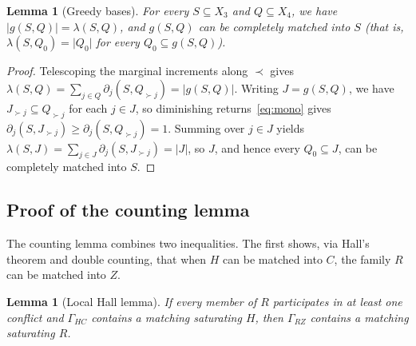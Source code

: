 \documentclass[11pt]{amsart}
\newtheorem{lemma}[theorem]{Lemma}
\theoremstyle{remark}
\newcommand{\abs}[1]{\lvert #1\rvert}
\begin{document}
\begin{lemma}[Greedy bases]\label{lem:greedy}
For every $S\subseteq X_3$ and $Q\subseteq X_4$, we have $\abs{g(S,Q)}=\lambda(S,Q)$, and $g(S,Q)$ can be completely matched into $S$ (that is, $\lambda(S,Q_0)=\abs{Q_0}$ for every $Q_0\subseteq g(S,Q)$).
\end{lemma}

\begin{proof}
Telescoping the marginal increments along $\prec$ gives $\lambda(S,Q)=\sum_{j\in Q}\partial_j(S,Q_{\succ j})=\abs{g(S,Q)}$. Writing $J=g(S,Q)$, we have $J_{\succ j}\subseteq Q_{\succ j}$ for each $j\in J$, so diminishing returns~\eqref{eq:mono} gives $\partial_j(S,J_{\succ j})\ge\partial_j(S,Q_{\succ j})=1$. Summing over $j\in J$ yields $\lambda(S,J)=\sum_{j\in J}\partial_j(S,J_{\succ j})=\abs J$, so $J$, and hence every $Q_0\subseteq J$, can be completely matched into $S$.
\end{proof}


\subsection{Proof of the counting lemma}\label{sec:count}

The counting lemma combines two inequalities. The first shows, via Hall's theorem and double counting, that when $H$ can be matched into $C$, the family $R$ can be matched into $Z$.

\begin{lemma}[Local Hall lemma]\label{lem:local}
If every member of $R$ participates in at least one conflict and $\Gamma_{HC}$ contains a matching saturating $H$, then $\Gamma_{RZ}$ contains a matching saturating $R$.
\end{lemma}
\end{document}
